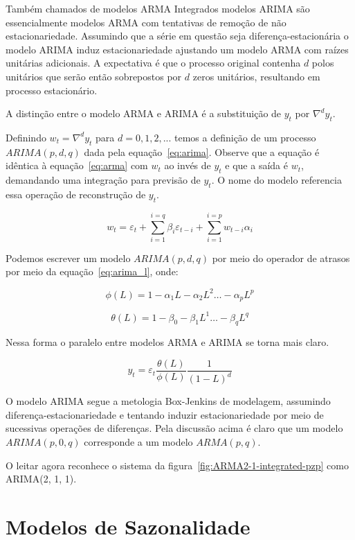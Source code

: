 Também chamados de modelos ARMA Integrados modelos ARIMA são essencialmente
modelos ARMA com tentativas de remoção de não estacionariedade. Assumindo que a
série em questão seja diferença-estacionária  o modelo ARIMA induz
estacionariedade ajustando um modelo ARMA com raízes unitárias adicionais. A
expectativa é que o processo original contenha $d$ polos unitários que serão
então sobrepostos por $d$ zeros unitários, resultando em processo estacionário.

A distinção entre o modelo ARMA e ARIMA é a substituição de $y_t$ por $\nabla^d
y_t$.

Definindo $w_t = \nabla^d y_t$ para $d = 0, 1, 2, ...$ temos a definição de um
processo $ARIMA(p, d, q)$ dada pela equação~\ref{eq:arima}. Observe que a
equação é idêntica à equação~\ref{eq:arma} com $w_t$ ao invés de $y_t$ e que a
saída é $w_t$, demandando uma integração para previsão de $y_t$. O nome do
modelo referencia essa operação de reconstrução de $y_t$.

\begin{equation}\label{eq:arima}
    w_t = \varepsilon_t  + \sum_{i=1}^{i=q} \beta_i \varepsilon_{t-i} + \sum_{i=1}^{i=p} w_{t-i}\alpha_i
\end{equation}

Podemos escrever um modelo $ARIMA(p, d, q)$ por meio do operador de atrasos
por meio da equação~\ref{eq:arima_l}, onde:

$$\phi(L) = 1 - \alpha_1 L - \alpha_2 L^2 \hdots - \alpha_p L^p$$

$$\theta(L) = 1 - \beta_0 - \beta_1 L^1 \hdots - \beta_q L^q$$

Nessa forma o paralelo entre modelos ARMA e ARIMA se torna mais claro.

\begin{equation}\label{eq:arima_l}
    y_t = \varepsilon_t \frac{\theta(L)}{\phi(L)} \frac{1}{(1-L)^d}
\end{equation}

O modelo ARIMA segue a metologia Box-Jenkins de modelagem, assumindo
diferença-estacionariedade e tentando induzir estacionariedade por meio de
sucessivas operações de diferenças. Pela discussão acima é claro que um modelo
$ARIMA(p, 0, q)$ corresponde a um modelo $ARMA(p, q)$.

O leitar agora reconhece o sistema da figura~\ref{fig:ARMA2-1-integrated-pzp}
como ARIMA(2, 1, 1).

\section{Modelos de Sazonalidade}

